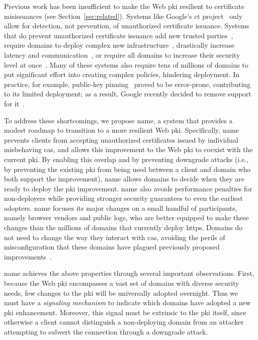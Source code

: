 Previous work has been insufficient to make the Web \ac{pki} resilient to
certificate misissuances (see Section~\ref{sec:related}). 
Systems like Google's \ac{ct} project~\cite{rfc6962} only allow
for detection, not prevention, of unauthorized certificate issuance. Systems
that do prevent unauthorized certificate issuance add new trusted
parties~\cite{kim2013accountable}, require domains to deploy complex new
infrastructure~\cite{rfc6698, szalachowski2014policert}, drastically increase
latency and communication~\cite{yu2016dtki}, or require 
all domains to increase their security level at once~\cite{basin2014arpki}.
Many of these systems also require tens of millions of domains 
to put significant effort into creating complex policies, hindering
deployment.  In practice, for example, public-key pinning~\cite{pkpinning} proved to
be error-prone, contributing to its limited deployment;
as a result, Google recently decided to remove support for it~\cite{palmer2017intent}.

To address these shortcomings, we propose \acs{name}, a system that provides a
modest roadmap to transition to a more resilient Web \ac{pki}. Specifically,
\ac{name} prevents clients from accepting
unauthorized certificates issued by individual misbehaving
\acp{ca}, and allows this improvement to the Web
\ac{pki} to coexist with the current \ac{pki}. By enabling this overlap and by
preventing downgrade attacks (i.e., by preventing the existing \ac{pki} from
being used between a client and domain who both support the improvement),
\ac{name} allows domains to decide when they are ready to deploy the \ac{pki}
improvement.  \ac{name} also avoids performance penalties for non-deployers while providing
stronger security guarantees to even the earliest adopters. \ac{name} 
focuses its major changes on a small handful of participants, namely browser
vendors and public logs, who are better equipped to make these changes than the
millions of domains that currently deploy \ac{https}. Domains do not need to
change the way they interact with \acp{ca}, avoiding the perils of
misconfiguration that these domains have plagued previously proposed
improvements~\cite{palmer2017intent}.

\ac{name} achieves the above properties through several important observations.
First, because the Web \ac{pki} encompasses a vast set of domains with diverse
security needs, few changes to the \ac{pki} will be universally adopted
overnight. Thus we must have a \emph{signaling mechanism} to indicate which
domains have adopted a new \ac{pki} enhancement. Moreover, this signal must be
extrinsic to the \ac{pki} itself, since otherwise a client cannot distinguish a
non-deploying domain from an attacker attempting to subvert the connection
through a downgrade attack.

